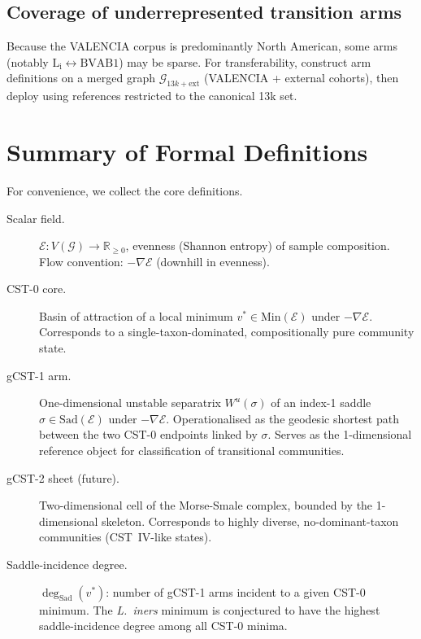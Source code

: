 \documentclass[11pt]{article}
\theoremstyle{plain}
\newcommand{\E}{\mathcal{E}}
\newcommand{\G}{\mathcal{G}}
\newcommand{\R}{\mathbb{R}}
\newcommand{\Min}{\mathrm{Min}}
\newcommand{\Sad}{\mathrm{Sad}}
\newcommand{\Li}{\mathrm{L}_\mathrm{i}}
\newcommand{\BVAB}{\mathrm{BVAB1}}
\begin{document}
\subsection{Coverage of underrepresented transition arms}

Because the VALENCIA corpus is predominantly North American, some arms (notably
$\Li\leftrightarrow\BVAB$) may be sparse.  For transferability, construct
arm definitions on a merged graph $\G_{13k+\mathrm{ext}}$ (VALENCIA + external
cohorts), then deploy using references restricted to the canonical 13k set.

\section{Summary of Formal Definitions}
\label{sec:summary}

For convenience, we collect the core definitions.

\begin{description}
  \item[Scalar field.] $\E : V(\G) \to \R_{\geq 0}$, evenness (Shannon
        entropy) of sample composition.  Flow convention: $-\nabla\E$
        (downhill in evenness).

  \item[CST-0 core.] Basin of attraction of a local minimum
        $v^* \in \Min(\E)$ under $-\nabla\E$.  Corresponds to a
        single-taxon-dominated, compositionally pure community state.

  \item[gCST-1 arm.] One-dimensional unstable separatrix
        $W^u(\sigma)$ of an index-1 saddle $\sigma \in \Sad(\E)$ under
        $-\nabla\E$.  Operationalised as the geodesic shortest path between the
        two CST-0 endpoints linked by $\sigma$.  Serves as the 1-dimensional
        reference object for classification of transitional communities.

  \item[gCST-2 sheet (future).] Two-dimensional cell of the Morse-Smale
        complex, bounded by the 1-dimensional skeleton.  Corresponds to
        highly diverse, no-dominant-taxon communities (CST~IV-like states).

  \item[Saddle-incidence degree.] $\deg_\Sad(v^*)$: number of gCST-1 arms
        incident to a given CST-0 minimum.  The \textit{L.\ iners} minimum is
        conjectured to have the highest saddle-incidence degree among all
        CST-0 minima.
\end{description}
\end{document}
